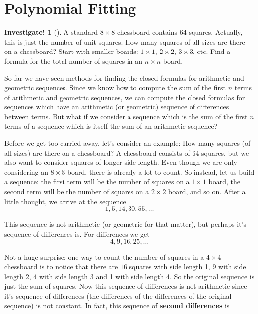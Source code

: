 \documentclass[10pt,]{book}
\newcommand{\terminology}[1]{\textbf{#1}}
\theoremstyle{plain}
\theoremstyle{definition}
\theoremstyle{definition}
\theoremstyle{definition}
\newtheorem{investigation}[project]{Investigate!}
\theoremstyle{definition}
\numberwithin{equation}{chapter}
\begin{document}
\section[{Polynomial Fitting}]{Polynomial Fitting}\label{sec_polyfit}
\begin{investigation}[]\label{investigation-6}
\hypertarget{p-229}{}%
A standard \(8 \times 8\) chessboard contains 64 squares. Actually, this is just the number of unit squares. How many squares of all sizes are there on a chessboard? Start with smaller boards: \(1\times 1\), \(2 \times 2\), \(3\times 3\), etc. Find a formula for the total number of squares in an \(n\times n\) board.%
\end{investigation}
\hypertarget{p-230}{}%
So far we have seen methods for finding the closed formulas for arithmetic and geometric sequences. Since we know how to compute the sum of the first \(n\) terms of arithmetic and geometric sequences, we can compute the closed formulas for sequences which have an arithmetic (or geometric) sequence of differences between terms. But what if we consider a sequence which is the sum of the first \(n\) terms of a sequence which is itself the sum of an arithmetic sequence?%
\par
\hypertarget{p-231}{}%
Before we get too carried away, let's consider an example: How many squares (of all sizes) are there on a chessboard? A chessboard consists of \(64\) squares, but we also want to consider squares of longer side length. Even though we are only considering an \(8 \times 8\) board, there is already a lot to count. So instead, let us build a sequence: the first term will be the number of squares on a \(1 \times 1\) board, the second term will be the number of squares on a \(2 \times 2\) board, and so on. After a little thought, we arrive at the sequence%
\begin{equation*}
1,5,14,30, 55,\ldots
\end{equation*}
%
\par
\hypertarget{p-232}{}%
This sequence is not arithmetic (or geometric for that matter), but perhaps it's sequence of differences is. For differences we get%
\begin{equation*}
4, 9, 16, 25, \ldots
\end{equation*}
%
\par
\hypertarget{p-233}{}%
Not a huge surprise: one way to count the number of squares in a \(4 \times 4\) chessboard is to notice that there are \(16\) squares with side length 1, 9 with side length 2, 4 with side length 3 and 1 with side length 4. So the original sequence is just the sum of squares. Now this sequence of differences is not arithmetic since it's sequence of differences (the differences of the differences of the original sequence) is not constant. In fact, this sequence of \terminology{second differences} is%
\end{document}
